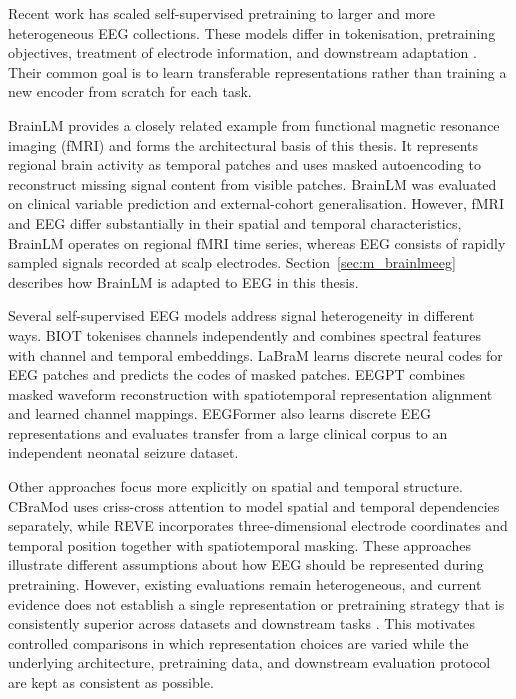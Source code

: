 Recent work has scaled self-supervised pretraining to larger and more heterogeneous EEG collections. These models differ in tokenisation, pretraining objectives, treatment of electrode information, and downstream adaptation \parencite{kuruppuEEGFoundationModels2025}. Their common goal is to learn transferable representations rather than training a new encoder from scratch for each task.

BrainLM \parencite{caroFOUNDATIONMODELBRAIN2024a} provides a closely related example from functional magnetic resonance imaging (fMRI) and forms the architectural basis of this thesis. It represents regional brain activity as temporal patches and uses masked autoencoding to reconstruct missing signal content from visible patches. BrainLM was evaluated on clinical variable prediction and external-cohort generalisation. However, fMRI and EEG differ substantially in their spatial and temporal characteristics, BrainLM operates on regional fMRI time series, whereas EEG consists of rapidly sampled signals recorded at scalp electrodes. Section~\ref{sec:m_brainlmeeg} describes how BrainLM is adapted to EEG in this thesis.

Several self-supervised EEG models address signal heterogeneity in different ways. BIOT \parencite{yangBIOTBiosignalTransformer2023} tokenises channels independently and combines spectral features with channel and temporal embeddings. LaBraM \parencite{jiangLARGEBRAINMODEL2024} learns discrete neural codes for EEG patches and predicts the codes of masked patches. EEGPT \parencite{wangEEGPTPretrainedTransformer2024} combines masked waveform reconstruction with spatiotemporal representation alignment and learned channel mappings. EEGFormer \parencite{chenEEGFormerTowardsTransferable2024} also learns discrete EEG representations and evaluates transfer from a large clinical corpus to an independent neonatal seizure dataset.

Other approaches focus more explicitly on spatial and temporal structure. CBraMod \parencite{wangCBraModCrissCrossBrain2025a} uses criss-cross attention to model spatial and temporal dependencies separately, while REVE \parencite{el2026reve} incorporates three-dimensional electrode coordinates and temporal position together with spatiotemporal masking. These approaches illustrate different assumptions about how EEG should be represented during pretraining. However, existing evaluations remain heterogeneous, and current evidence does not establish a single representation or pretraining strategy that is consistently superior across datasets and downstream tasks \parencite{kuruppuEEGFoundationModels2025}. This motivates controlled comparisons in which representation choices are varied while the underlying architecture, pretraining data, and downstream evaluation protocol are kept as consistent as possible.


